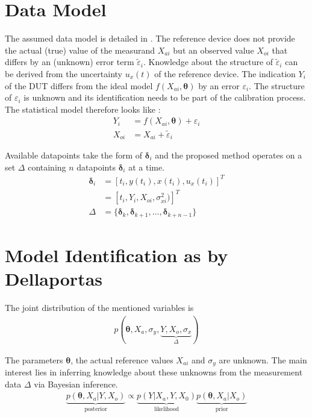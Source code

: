\documentclass[10pt]{article}
\renewcommand{\vec}[1]{\boldsymbol{#1}}
\begin{document}
    \section{Data Model}
    The assumed data model is detailed in \cite{dellaportas_1995}.
    The reference device does not provide the actual (true) value of the measurand $X_{ai}$ but an observed value $X_{oi}$ that differs by an (unknown) error term $\tilde{\varepsilon}_i$.
    Knowledge about the structure of $\tilde{\varepsilon}_i$ can be derived from the uncertainty $u_x(t)$ of the reference device.
    The indication $Y_i$ of the DUT differs from the ideal model $f(X_{ai}, \vec{\theta})$ by an error $\varepsilon_i$.
    The structure of $\varepsilon_i$ is unknown and its identification needs to be part of the calibration process.
    The statistical model therefore looks like \cite{dellaportas_1995}:
    \begin{align}
        Y_i &= f(X_{ai}, \vec{\theta}) + \varepsilon_i \\
        X_{oi} &= X_{ai} + \tilde{\varepsilon}_i
    \end{align}
    
    Available datapoints take the form of $\vec{\delta}_i$ and the proposed method operates on a set $\Delta$ containing $n$ datapoints $\vec{\delta}_i$ at a time.
    \begin{align}
        \vec{\delta}_i &= [t_i, y(t_i), x(t_i), u_x(t_i)]^T \nonumber \\
                     &= [t_i, Y_i, X_{oi}, \sigma_{xi}^2)]^T \\
        \Delta &= \{\vec{\delta}_k, \vec{\delta}_{k+1}, \dots,  \vec{\delta}_{k+n-1}\} 
    \end{align}
    
    
    \section{Model Identification as by Dellaportas}
    The joint distribution of the mentioned variables is
    \begin{align}
        p(\vec{\theta}, X_a, \sigma_y, \underbrace{Y, X_o, \sigma_x}_{\Delta})
    \end{align}
    
    The parameters $\vec{\theta}$, the actual reference values $X_{ai}$ and $\sigma_{y}$ are unknown.
    The main interest lies in inferring knowledge about these unknowns from the measurement data $\Delta$ via Bayesian inference.
    \begin{align}
        \underbrace{p(\vec{\theta}, X_a | Y, X_o)}_{\text{posterior}} \propto \underbrace{p(Y | X_a, Y, X_0)}_{\text{likelihood}} \underbrace{p(\vec{\theta}, X_a | X_o)}_{\text{prior}}
    \end{align}
    
\end{document}
